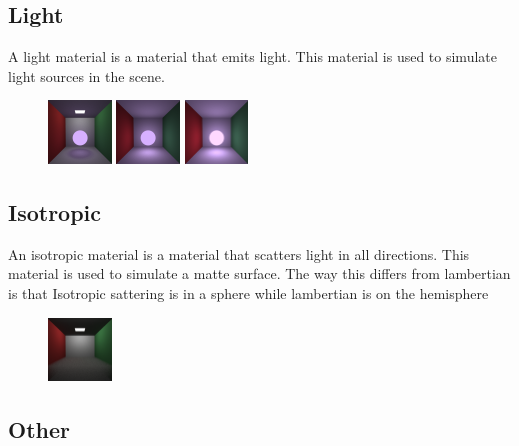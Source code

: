 \documentclass{article}
\begin{document}
    \subsection{Light}
    A light material is a material that emits light. This material is used to simulate light sources in the scene. \par
    \begin{figure}[h!]
        \centering
        \includegraphics[width=0.15\textwidth]{samples/LightSphereLit.png}
        \includegraphics[width=0.15\textwidth]{samples/LightSphereUnlit.png}
        \includegraphics[width=0.15\textwidth]{samples/LightSphereUnlitBright.png}
    \end{figure}


    \subsection{Isotropic}
    An isotropic material is a material that scatters light in all directions. This material is used to simulate a matte surface. The way this differs from lambertian is that Isotropic sattering is in a sphere while lambertian is on the hemisphere \par
    \begin{figure}[h!]
        \centering
        \includegraphics[width=0.15\textwidth]{samples/WeGetItYouVape.png}
    \end{figure}



    \subsection{Other}
\end{document}
